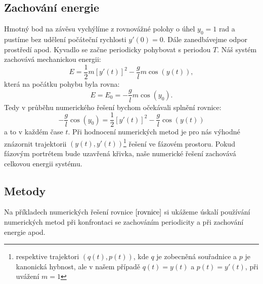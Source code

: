 \subsection{Zachování energie}
\label{sec:Zachování energie}
Hmotný bod na závěsu vychýlíme z rovnovážné polohy o úhel $y_{0}=1$ \si{rad} a pustíme bez udělení počáteční rychlosti $y'(0)=0$. Dále zanedbávejme odpor prostředí apod. Kyvadlo se začne periodicky pohybovat s periodou $T$. Náš systém zachovává mechanickou energii:
\begin{equation}
E = \frac{1}{2} m [y'(t)]^{2}- \frac{g}{l} m \cos(y(t)),
\end{equation} 
která na počátku pohybu byla rovna:
\begin{equation}
E = E_{0} = - \frac{g}{l} m \cos(y_{0}).
\end{equation} 
Tedy v průběhu numerického řešení bychom očekávali splnění rovnice:
\begin{equation}
\label{ener}
\boxed{- \frac{g}{l}  \cos(y_{0}) = \frac{1}{2} [y'(t)]^{2} - \frac{g}{l} \cos(y(t))}
\end{equation} 
a to v každém čase $t$. Při hodnocení numerických metod je pro nás výhodné znázornit trajektorii $(y(t),y'(t))$\footnote{respektive trajektori $(q(t),p(t))$, kde $q$ je zobecněná souřadnice a $p$ je kanonická hybnost, ale v našem případě $q(t)=y(t)$ a $p(t)=y'(t)$, při uvážení $m=1$} řešení ve fázovém prostoru. Pokud fázovým portrétem bude uzavřená křivka, naše numerické řešení zachovává celkovou energii systému.

\subsection{Metody}
\label{sec:Metody}

Na příkladech numerických řešení rovnice $\eqref{rovnice}$ si ukážeme úskalí používání numerických metod při konfrontaci se zachováním periodicity a při zachování energie apod. 

